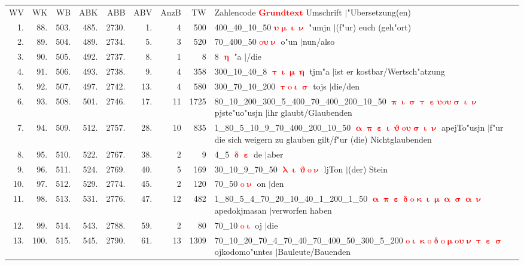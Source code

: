 \documentclass[a4paper,10pt,landscape]{article}
\begin{document}
\begin{tabular}{rrrrrrrrp{120mm}}
WV&WK&WB&ABK&ABB&ABV&AnzB&TW&Zahlencode \textcolor{red}{$\boldsymbol{Grundtext}$} Umschrift $|$"Ubersetzung(en)\\
1.&88.&503.&485.&2730.&1.&4&500&400\_40\_10\_50 \textcolor{red}{$\boldsymbol{\upsilon\upmu\upiota\upnu}$} "umjn $|$(f"ur) euch (geh"ort)\\
2.&89.&504.&489.&2734.&5.&3&520&70\_400\_50 \textcolor{red}{$\boldsymbol{\mathrm{o}\upsilon\upnu}$} o"un $|$nun/also\\
3.&90.&505.&492.&2737.&8.&1&8&8 \textcolor{red}{$\boldsymbol{\upeta}$} "a $|$/die\\
4.&91.&506.&493.&2738.&9.&4&358&300\_10\_40\_8 \textcolor{red}{$\boldsymbol{\uptau\upiota\upmu\upeta}$} tjm"a $|$ist er kostbar/Wertsch"atzung\\
5.&92.&507.&497.&2742.&13.&4&580&300\_70\_10\_200 \textcolor{red}{$\boldsymbol{\uptau\mathrm{o}\upiota\upsigma}$} tojs $|$die/den\\
6.&93.&508.&501.&2746.&17.&11&1725&80\_10\_200\_300\_5\_400\_70\_400\_200\_10\_50 \textcolor{red}{$\boldsymbol{\uppi\upiota\upsigma\uptau\upepsilon\upsilon\mathrm{o}\upsilon\upsigma\upiota\upnu}$} pjste"uo"usjn $|$ihr glaubt/Glaubenden\\
7.&94.&509.&512.&2757.&28.&10&835&1\_80\_5\_10\_9\_70\_400\_200\_10\_50 \textcolor{red}{$\boldsymbol{\upalpha\uppi\upepsilon\upiota\upvartheta\mathrm{o}\upsilon\upsigma\upiota\upnu}$} apejTo"usjn $|$f"ur die sich weigern zu glauben gilt/f"ur (die) Nichtglaubenden\\
8.&95.&510.&522.&2767.&38.&2&9&4\_5 \textcolor{red}{$\boldsymbol{\updelta\upepsilon}$} de $|$aber\\
9.&96.&511.&524.&2769.&40.&5&169&30\_10\_9\_70\_50 \textcolor{red}{$\boldsymbol{\uplambda\upiota\upvartheta\mathrm{o}\upnu}$} ljTon $|$(der) Stein\\
10.&97.&512.&529.&2774.&45.&2&120&70\_50 \textcolor{red}{$\boldsymbol{\mathrm{o}\upnu}$} on $|$den\\
11.&98.&513.&531.&2776.&47.&12&482&1\_80\_5\_4\_70\_20\_10\_40\_1\_200\_1\_50 \textcolor{red}{$\boldsymbol{\upalpha\uppi\upepsilon\updelta\mathrm{o}\upkappa\upiota\upmu\upalpha\upsigma\upalpha\upnu}$} apedokjmasan $|$verworfen haben\\
12.&99.&514.&543.&2788.&59.&2&80&70\_10 \textcolor{red}{$\boldsymbol{\mathrm{o}\upiota}$} oj $|$die\\
13.&100.&515.&545.&2790.&61.&13&1309&70\_10\_20\_70\_4\_70\_40\_70\_400\_50\_300\_5\_200 \textcolor{red}{$\boldsymbol{\mathrm{o}\upiota\upkappa\mathrm{o}\updelta\mathrm{o}\upmu\mathrm{o}\upsilon\upnu\uptau\upepsilon\upsigma}$} ojkodomo"untes $|$Bauleute/Bauenden\\

\end{tabular}
\end{document}
